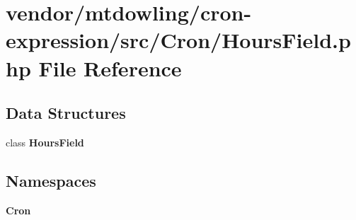 \section{vendor/mtdowling/cron-\/expression/src/\+Cron/\+Hours\+Field.php File Reference}
\label{_hours_field_8php}
\subsection*{Data Structures}
\begin{DoxyCompactItemize}
\item 
class {\bf Hours\+Field}
\end{DoxyCompactItemize}
\subsection*{Namespaces}
\begin{DoxyCompactItemize}
\item 
 {\bf Cron}
\end{DoxyCompactItemize}

